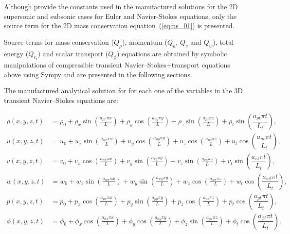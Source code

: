 \documentclass[10pt]{article}
\begin{document}
Although \citet{Roy2002} provide the constants used in the manufactured solutions for the 2D supersonic and subsonic cases for Euler and Navier-Stokes equations, only the source term for the 2D mass conservation equation~(\ref{eq:ns_01}) is presented.


Source terms  for mass conservation ($Q_\rho$), momentum ($Q_u$, $Q_v$ and $Q_w$), total energy ($Q_{e_t}$) and scalar transport ($Q_\phi$) equations are obtained by symbolic manipulations of compressible transient Navier--Stokes+transport equations above using Sympy and are presented in the following sections.




The manufactured analytical solution for for each one of the variables in the 3D transient Navier--Stokes equations are:

\begin{equation}
\begin{split}
\label{eq:manufactured_3d} 
\rho\left( x ,y ,z,t\right) &=  \rho_{0}+ \rho_{x} \sin\left(\frac{a_{ \rho  x} \pi x}{L}\right)+ \rho_{y} \cos\left(\frac{a_{ \rho  y} \pi y}{L}\right) + \rho_{z} \sin\left(\frac{a_{ \rho  z} \pi z}{L}\right) + \rho_t \sin\left(\dfrac{a_{\rho t} \pi t}{L_t}\right),\\
u\left( x ,y ,z,t\right) &= u_{0}+u_{x} \sin\left(\frac{a_{u  x} \pi x}{L}\right)+u_{y} \cos\left(\frac{a_{u  y} \pi y}{L}\right)+u_{z} \cos\left(\frac{a_{u  z} \pi z}{L}\right) + u_t \cos\left(\dfrac{a_{u t} \pi t}{L_t}\right),\\
v\left( x ,y ,z,t\right) &= v_{0}+v_{x} \cos\left(\frac{a_{v  x} \pi x}{L}\right)+v_{y} \sin\left(\frac{a_{v  y} \pi y}{L}\right)+v_{z} \sin\left(\frac{a_{v  z} \pi z}{L}\right)+ v_t \sin\left(\dfrac{a_{v t} \pi t}{L_t}\right), \\
w\left( x ,y ,z,t\right) &= w_{0}+w_{x} \sin\left(\frac{a_{w  x} \pi x}{L}\right)+w_{y} \sin\left(\frac{a_{w  y} \pi y}{L}\right)+ w_{z} \cos\left(\frac{a_{w  z} \pi z}{L}\right)+ w_t \cos\left(\dfrac{a_{w t} \pi t}{L_t}\right) ,\\
p\left( x ,y ,z,t\right) &= p_{0}+p_{x} \cos\left(\frac{a_{p  x} \pi x}{L}\right)+p_{y} \sin\left(\frac{a_{p  y} \pi y}{L}\right)+ p_{z} \cos\left(\frac{a_{p  z} \pi z}{L}\right)+ p_t \cos\left(\dfrac{a_{p t} \pi t}{L_t}\right),\\
\phi\left( x ,y ,z,t\right) &= \phi_{0}+\phi_{x} \cos\left(\frac{a_{\phi  x} \pi x}{L}\right)+\phi_{y} \cos\left(\frac{a_{\phi  y} \pi y}{L}\right)+ \phi_{z} \sin\left(\frac{a_{\phi  z} \pi z}{L}\right)+ \phi_t \cos\left(\dfrac{a_{\phi t} \pi t}{L_t}\right).\\
\end{split}
\end{equation}
\end{document}
